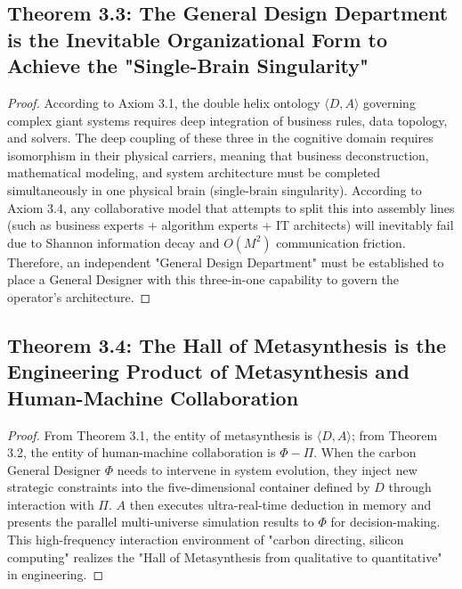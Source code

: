 \documentclass[11pt,a4paper]{article}
\begin{document}
\subsection*{Theorem 3.3: The General Design Department is the Inevitable Organizational Form to Achieve the "Single-Brain Singularity"}
\begin{proof}
According to Axiom 3.1, the double helix ontology $\langle D, A \rangle$ governing complex giant systems requires deep integration of business rules, data topology, and solvers. The deep coupling of these three in the cognitive domain requires isomorphism in their physical carriers, meaning that business deconstruction, mathematical modeling, and system architecture must be completed simultaneously in one physical brain (single-brain singularity). According to Axiom 3.4, any collaborative model that attempts to split this into assembly lines (such as business experts + algorithm experts + IT architects) will inevitably fail due to Shannon information decay and $O(M^2)$ communication friction. Therefore, an independent "General Design Department" must be established to place a General Designer with this three-in-one capability to govern the operator's architecture.
\end{proof}

\subsection*{Theorem 3.4: The Hall of Metasynthesis is the Engineering Product of Metasynthesis and Human-Machine Collaboration}
\begin{proof}
From Theorem 3.1, the entity of metasynthesis is $\langle D, A \rangle$; from Theorem 3.2, the entity of human-machine collaboration is $\Phi - \Pi$. When the carbon General Designer $\Phi$ needs to intervene in system evolution, they inject new strategic constraints into the five-dimensional container defined by $D$ through interaction with $\Pi$. $A$ then executes ultra-real-time deduction in memory and presents the parallel multi-universe simulation results to $\Phi$ for decision-making. This high-frequency interaction environment of "carbon directing, silicon computing" realizes the "Hall of Metasynthesis from qualitative to quantitative" in engineering.
\end{proof}
\end{document}
